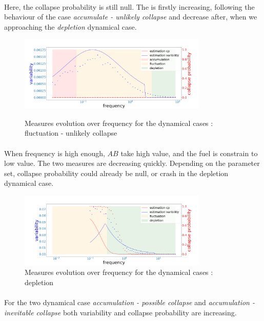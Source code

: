 \documentclass{article}
\begin{document}
\paragraph{}
Here, the collapse probability is still null. The is firstly increasing, following the behaviour of the case \textit{accumulate - unlikely collapse} and decrease after, when we approaching the \textit{depletion} dynamical case.


\begin{figure}[h!]
\begin{center}
\includegraphics[width=9cm]{results/measures_fluctu_unlikely.png} \\
\end{center}
\caption{\label{fig:temp}Measures evolution over frequency for the dynamical cases : fluctuation - unlikely collapse}
\end{figure}


\paragraph{}
When frequency is high enough, $AB$ take high value, and the fuel is constrain to low value. The two measures are decreasing quickly. Depending on the parameter set, collapse probability could already be null, or crash in the depletion dynamical case.

\begin{figure}[h!]
\begin{center}
\includegraphics[width=9cm]{results/measures_depletion.png}
\end{center}
\caption{\label{fig:temp}Measures evolution over frequency for the dynamical cases : depletion}
\end{figure}


\paragraph{}
For the two dynamical case \textit{accumulation - possible collapse} and \textit{accumulation - inevitable collapse} both variability and collapse probability are increasing.
\end{document}
